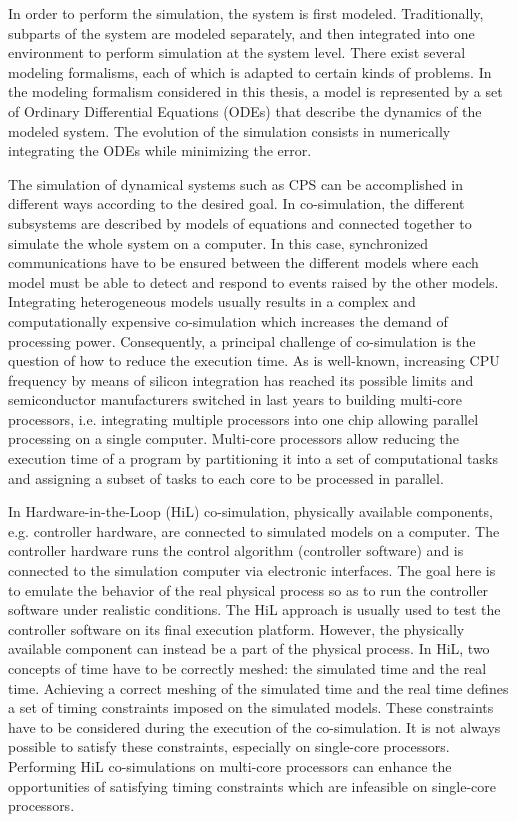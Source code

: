 In order to perform the simulation, the system is first modeled. Traditionally, subparts of the system are modeled separately, and then integrated into one environment to perform simulation at the system level. There exist several modeling formalisms, each of which is adapted to certain kinds of problems. In the modeling formalism considered in this thesis, a model is represented by a set of Ordinary Differential Equations (ODEs) that describe the dynamics of the modeled system. The evolution of the simulation consists in numerically integrating the ODEs while minimizing the error.

The simulation of dynamical systems such as CPS can be accomplished in different ways according to the desired goal. In co-simulation, the different subsystems are described by models of equations and connected together to simulate the whole system on a computer. In this case, synchronized communications have to be ensured between the different models where each model must be able to detect and respond to events raised by the other models. Integrating heterogeneous models usually results in a complex and computationally expensive co-simulation which increases the demand of processing power. Consequently, a principal challenge of co-simulation is the question of how to reduce the execution time. As is well-known, increasing CPU frequency by means of silicon integration has reached its possible limits and semiconductor manufacturers switched in last years to building multi-core processors, i.e. integrating multiple processors into one chip allowing parallel processing on a single computer. Multi-core processors allow reducing the execution time of a program by partitioning it into a set of computational tasks and assigning a subset of tasks to each core to be processed in parallel.

In Hardware-in-the-Loop (HiL) co-simulation, physically available components, e.g. controller hardware, are connected to simulated models on a computer. The controller hardware runs the control algorithm (controller software) and is connected to the simulation computer via electronic interfaces. The goal here is to emulate the behavior of the real physical process so as to run the controller software under realistic conditions. The HiL approach is usually used to test the controller software on its final execution platform. However, the physically available component can instead be a part of the physical process. In HiL, two concepts of time have to be correctly meshed: the simulated time and the real time. %
Achieving a correct meshing of the simulated time and the real time defines a set of timing constraints imposed on the simulated models. These constraints have to be considered during the execution of the co-simulation. It is not always possible to satisfy these constraints, especially on single-core processors. Performing HiL co-simulations on multi-core processors can enhance the opportunities of satisfying timing constraints which are infeasible on single-core processors.

